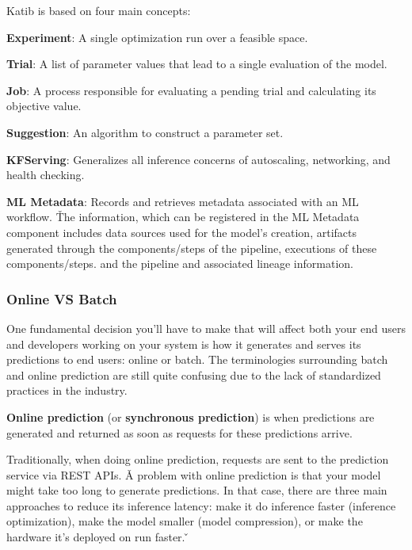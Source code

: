 Katib is based on four main concepts:
\bit
\item \textbf{Experiment}: A single optimization run over a feasible space.
\item \textbf{Trial}: A list of parameter values that lead to a single evaluation of the model.
\item \textbf{Job}: A process responsible for evaluating a pending trial and calculating its objective value.
\item \textbf{Suggestion}: An algorithm to construct a parameter set.
\eit
\item \textbf{KFServing}: Generalizes all inference concerns of autoscaling, networking, and health checking.
\item \textbf{ML Metadata}: Records and retrieves metadata associated with an ML workflow. \v

The information, which can be registered in the ML Metadata component includes data sources used for the model's
creation, artifacts generated through the components/steps of the pipeline, executions of these components/steps.
and the pipeline and associated lineage information.
\eit

\subsubsection{Online VS Batch}

One fundamental decision you'll have to make that will affect both your end users and developers working on your
system is how it generates and serves its predictions to end users: online or batch. The terminologies surrounding
batch and online prediction are still quite confusing due to the lack of standardized practices in the industry.

\textbf{Online prediction} (or \textbf{synchronous prediction}) is when predictions are generated and returned as soon
as requests for these predictions arrive.
\ed


Traditionally, when doing online prediction, requests are sent to the prediction service via REST APIs. \v

A problem with online prediction is that your model might take too long to generate predictions. In that case, there
are three main approaches to reduce its inference latency: make it do inference faster (inference optimization), make
the model smaller (model compression), or make the hardware it's deployed on run faster. \v

